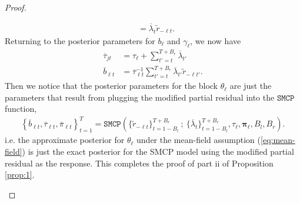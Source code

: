 \begin{proof}
\begin{enumerate}[label=\roman*.]
\begin{align*}
    &=  \overline{\lambda}_{t} \tilde{r}_{-\ell t}.
\end{align*}
Returning to the posterior parameters for $b_{\ell}$ and $\gamma_{\ell}$, we now have 
\begin{align*}
    \overline{\tau}_{jt} &=  \tau_{\ell} +  \sum_{t'=t}^{T+B_r} \overline{\lambda}_{t'} \\
    \overline{b}_{\ell t}  &= \overline{\tau}_{\ell t}^{-1}  \sum_{t'=t}^{T+B_r} \overline{\lambda}_{t'}\tilde{r}_{-\ell t'}.
\end{align*}
Then we notice that the posterior parameters for the block $\theta_\ell$ are just the parameters that result from plugging the modified partial residual into the $\texttt{SMCP}$ function,
\small
\begin{align*}
    \left\{\overline{b}_{\ell t}, \overline{\tau}_{\ell t}, \overline{\pi}_{\ell t}\right\}_{t=1}^T = \texttt{SMCP}\left(\{\tilde{r}_{-\ell t}\}_{t=1-B_l}^{T+B_r} \:;\: \{\overline{\lambda}_t\}_{t=1-B_l}^{T+B_r}, \tau_{\ell}, \boldsymbol{\pi}_{\ell}, B_l,B_r\right).
\end{align*}
\normalsize
i.e. the approximate posterior for $\theta_\ell$ under the mean-field assumption (\ref{eq:mean-field}) is just the exact posterior for the SMCP model using the modified partial residual as the response. This completes the proof of part ii of Proposition \ref{prop:1}.


\end{enumerate}
\end{proof}
